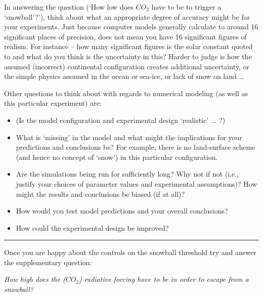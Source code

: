 \documentclass[11pt,fleqn]{book} %
\begin{document}
In answering the question (‘How low does \(CO_{2}\) have to be to trigger a ‘snowball’?’), think about what an appropriate degree of accuracy might be for your experiments. Just because computer models generally calculate to around 16 significant places of precision, does not mean you have 16 significant figures of realism. For instance – how many significant figures is the solar constant quoted to and what do you think is the uncertainty in this? Harder to judge is how the assumed (incorrect) continental configuration creates additional uncertainty, or the simple physics assumed in the ocean or sea-ice, or lack of snow on land …

\vspace{1mm}
Other questions to think about with regards to numerical modeling (as well as this particular experiment) are:

\begin{itemize}[noitemsep]
\setlength{\itemindent}{.2in}
\vspace{1mm}
\item  (Is the model configuration and experimental design ‘realistic’ ... ?)
\vspace{1mm}
\item  What is ‘missing’ in the model and what might the implications for your predictions and conclusions be? For example, there is no land-surface scheme (and hence no concept of ‘snow’) in this particular configuration.
\vspace{1mm}
\item Are the simulations being run for sufficiently long? Why not if not (i.e., justify your choices of parameter values and experimental assumptions)? How might the results and conclusions be biased (if at all)?
\vspace{1mm}
\item How would you test model predictions and your overall conclusions?
\vspace{1mm}
\item How could the experimental design be improved?
\end{itemize}

\vspace{1mm}
\noindent\rule{4cm}{0.5pt}
\vspace{2mm}

\noindent Once you are happy about the controls on the snowball threshold try and answer the supplementary question:

\vspace{2mm}
\noindent \textit{How high does the (\(CO_{2}\)) radiative forcing have to be in order to escape from a snowball?}
\vspace{2mm}
\end{document}

